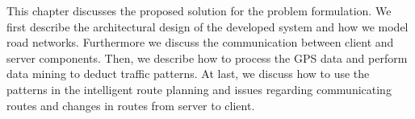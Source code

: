 This chapter discusses the proposed solution for the problem formulation. We first describe the architectural design of the developed system and how we model road networks. Furthermore we discuss the communication between client and server components. Then, we describe how to process the GPS data and perform data mining to deduct traffic patterns. At last, we discuss how to use the patterns in the intelligent route planning and issues regarding communicating routes and changes in routes from server to client.